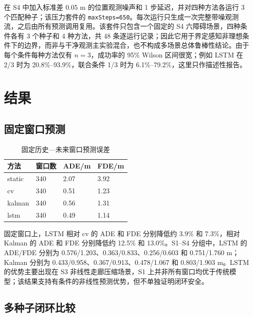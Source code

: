 \documentclass[11pt,a4paper]{ctexart}
\begin{document}
在 S4 中加入标准差 0.05 m 的位置观测噪声和 1 步延迟，并对四种方法各运行 3 个匹配种子；该压力套件的 \texttt{maxSteps=650}。每次运行只生成一次完整带噪观测流，之后由所有预测调用复用。该套件只包含一个固定的 S4 六障碍场景，四种条件各有 3 个种子和 4 种方法，共 48 条逐运行记录；因此它用于界定感知非理想条件下的边界，而非与干净观测主实验混合，也不构成多场景总体鲁棒性结论。由于每个条件每种方法仅有 $n=3$，成功率的 95\% Wilson 区间很宽；例如 LSTM 在 2/3 时为 20.8\%–93.9\%，联合条件 1/3 时为 6.1\%–79.2\%，这里只作描述性报告。

\section{结果}

\subsection{固定窗口预测}

\begin{table}[t]
\centering
\small
\caption{固定历史—未来窗口预测误差}
\label{tab:table-2}
\begin{tabularx}{\linewidth}{YYYY}
\toprule
方法 & 窗口数 & ADE/m & FDE/m \\
\midrule
static & 340 & 2.07 & 3.92 \\
cv & 340 & 0.51 & 1.23 \\
kalman & 340 & 0.56 & 1.31 \\
lstm & 340 & 0.49 & 1.14 \\
\bottomrule
\end{tabularx}
\end{table}

固定窗口上，LSTM 相对 cv 的 ADE 和 FDE 分别降低约 3.9\% 和 7.3\%，相对 Kalman 的 ADE 和 FDE 分别降低约 12.5\% 和 13.0\%。S1–S4 分组中，LSTM 的 ADE/FDE 分别为 0.576/1.203、0.363/0.833、0.256/0.603 和 0.751/1.760 m；Kalman 分别为 0.433/0.958、0.367/0.913、0.478/1.067 和 0.803/1.903 m。LSTM 的优势主要出现在 S3 非线性走廊压缩场景，S1 上并非所有窗口均优于传统模型；该结果支持有条件的非线性预测优势，但不单独证明闭环安全。

\subsection{多种子闭环比较}
\end{document}
